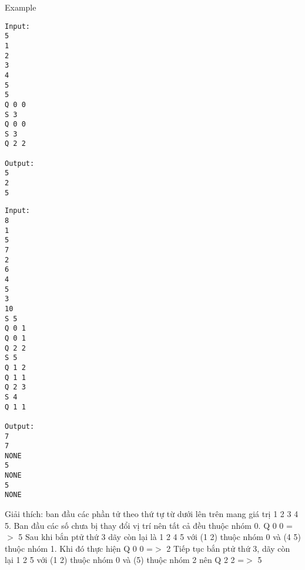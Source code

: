 Example
\begin{verbatim}
Input:
5
1
2
3
4
5
5
Q 0 0
S 3
Q 0 0
S 3
Q 2 2

Output:
5
2
5
\end{verbatim}
\begin{verbatim}
Input:
8
1
5
7
2
6
4
5
3
10
S 5
Q 0 1
Q 0 1
Q 2 2
S 5
Q 1 2
Q 1 1
Q 2 3
S 4
Q 1 1

Output:
7
7
NONE
5
NONE
5
NONE
\end{verbatim}

   Giải thích: ban đầu các phần tử theo thứ tự từ dưới lên trên mang giá trị 1 2 3 4 5. Ban đầu các số chưa bị thay đổi vị trí nên tất cả đều thuộc nhóm 0. Q 0 0 =$>$ 5 Sau khi bắn ptử thứ 3 dãy còn lại là 1 2 4 5 với (1 2) thuộc nhóm 0 và (4 5) thuộc nhóm 1. Khi đó thực hiện Q 0 0 =$>$ 2 Tiếp tục bắn ptử thứ 3, dãy còn lại 1 2 5 với (1 2) thuộc nhóm 0 và (5) thuộc nhóm 2 nên Q 2 2 =$>$ 5
